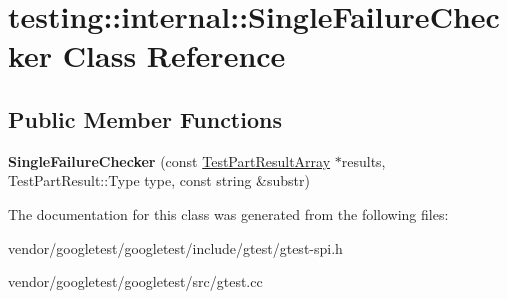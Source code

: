 \hypertarget{classtesting_1_1internal_1_1_single_failure_checker}{}\section{testing\+:\+:internal\+:\+:Single\+Failure\+Checker Class Reference}
\label{classtesting_1_1internal_1_1_single_failure_checker}
\subsection*{Public Member Functions}
\begin{DoxyCompactItemize}
\item 
\mbox{\label{classtesting_1_1internal_1_1_single_failure_checker_a6d350d385526c97c9982e928f5f8fb56}} 
{\bfseries Single\+Failure\+Checker} (const \hyperlink{classtesting_1_1_test_part_result_array}{Test\+Part\+Result\+Array} $\ast$results, Test\+Part\+Result\+::\+Type type, const string \&substr)
\end{DoxyCompactItemize}


The documentation for this class was generated from the following files\+:\begin{DoxyCompactItemize}
\item 
vendor/googletest/googletest/include/gtest/gtest-\/spi.\+h\item 
vendor/googletest/googletest/src/gtest.\+cc\end{DoxyCompactItemize}
